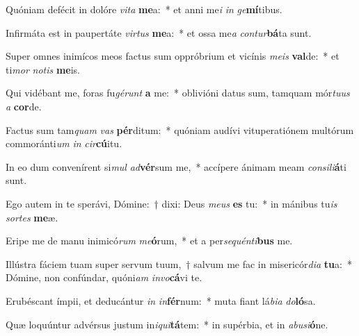 \item Quóniam defécit in dolóre \textit{vi}\textit{ta} \textbf{me}a:~* et anni me\textit{i} \textit{in} \textit{ge}\textbf{mí}tibus.
\item Infirmáta est in paupertáte \textit{vir}\textit{tus} \textbf{me}a:~* et ossa me\textit{a} \textit{con}\textit{tur}\textbf{bá}ta sunt.
\item Super omnes inimícos meos factus sum oppróbrium et vicínis \textit{me}\textit{is} \textbf{val}de:~* et ti\textit{mor} \textit{no}\textit{tis} \textbf{me}is.
\item Qui vidébant me, foras fu\textit{gé}\textit{runt} \textbf{a} me:~* oblivióni datus sum, tamquam mór\textit{tu}\textit{us} \textit{a} \textbf{cor}de.
\item Factus sum tam\textit{quam} \textit{vas} \textbf{pér}ditum:~* quóniam audívi vituperatiónem multórum commoránti\textit{um} \textit{in} \textit{cir}\textbf{cú}itu.
\item In eo dum convenírent si\textit{mul} \textit{ad}\textbf{vér}sum me,~* accípere ánimam meam \textit{con}\textit{si}\textit{li}\textbf{á}ti sunt.
\item Ego autem in te sperávi, Dómine:~† dixi: Deus \textit{me}\textit{us} \textbf{es} tu:~* in mánibus tu\textit{is} \textit{sor}\textit{tes} \textbf{me}æ.
\item Eripe me de manu inimicó\textit{rum} \textit{me}\textbf{ó}rum,~* et a per\textit{se}\textit{quén}\textit{ti}\textbf{bus} me.
\item Illústra fáciem tuam super servum tuum,~† salvum me fac in misericór\textit{di}\textit{a} \textbf{tu}a:~* Dómine, non confúndar, quóni\textit{am} \textit{in}\textit{vo}\textbf{cá}vi te.
\item Erubéscant ímpii, et deducántur \textit{in} \textit{in}\textbf{fér}num:~* muta fiant lá\textit{bi}\textit{a} \textit{do}\textbf{ló}sa.
\item Quæ loquúntur advérsus justum in\textit{i}\textit{qui}\textbf{tá}tem:~* in supérbia, et in \textit{ab}\textit{u}\textit{si}\textbf{ó}ne.
